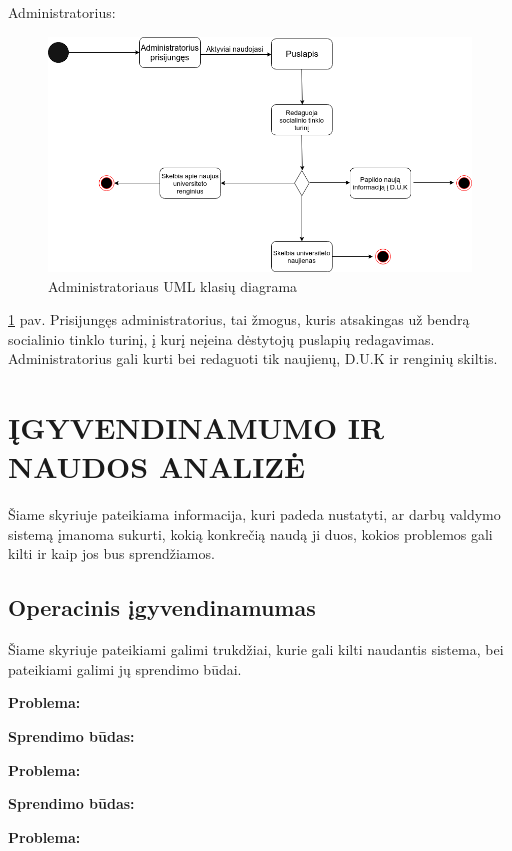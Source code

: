 \documentclass{VUMIFPSkursinis}
\begin{document}
Administratorius: \\
\begin{figure}[H]
\centering
\includegraphics[width=\linewidth]{img/administratorius.png}
\caption{Administratoriaus UML klasių diagrama}
\label{fig:administratoriu}
\end{figure}
\ref{fig:administratoriu} pav. Prisijungęs administratorius, tai žmogus, kuris atsakingas už bendrą socialinio tinklo turinį, į kurį neįeina dėstytojų puslapių redagavimas. Administratorius gali kurti bei redaguoti tik naujienų, D.U.K ir renginių skiltis.\\

\newpage
\section{ĮGYVENDINAMUMO IR NAUDOS ANALIZĖ}
Šiame skyriuje pateikiama informacija, kuri padeda nustatyti, ar darbų valdymo sistemą
įmanoma sukurti, kokią konkrečią naudą ji duos, kokios problemos gali kilti ir kaip jos bus sprendžiamos.

\subsection{Operacinis įgyvendinamumas}
Šiame skyriuje pateikiami galimi trukdžiai, kurie gali kilti naudantis sistema, bei pateikiami
galimi jų sprendimo būdai.
\bigskip

\textbf{Problema:}

\textbf{Sprendimo būdas:}

\bigskip

\textbf{Problema:}

\textbf{Sprendimo būdas:}

\bigskip

\textbf{Problema:}
\end{document}
